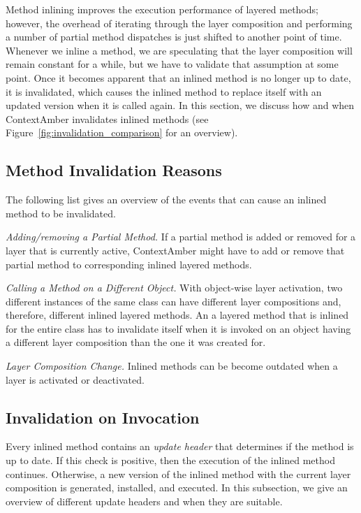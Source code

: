 \documentclass{sig-alternate}
\begin{document}
Method inlining improves the execution performance of layered methods; however, the overhead of iterating through the layer composition and performing a number of partial method dispatches is just shifted to another point of time. Whenever we inline a method, we are speculating that the layer composition will remain constant for a while, but we have to validate that assumption at some point. Once it becomes apparent that an inlined method is no longer up to date, it is invalidated, which causes the inlined method to replace itself with an updated version when it is called again. In this section, we discuss how and when ContextAmber invalidates inlined methods (see Figure~\ref{fig:invalidation_comparison} for an overview).

\subsection{Method Invalidation Reasons}
The following list gives an overview of the events that can cause an inlined method to be invalidated.

\begin{compact_item}
    \item \emph{Adding/removing a Partial Method.} If a partial method is added or removed for a layer that is currently active, ContextAmber might have to add or remove that partial method to corresponding inlined layered methods.
    \item \emph{Calling a Method on a Different Object.} With object-wise layer activation, two different instances of the same class can have different layer compositions and, therefore, different inlined layered methods. An a layered method that is inlined for the entire class has to invalidate itself when it is invoked on an object having a different layer composition than the one it was created for.
    \item \emph{Layer Composition Change.} Inlined methods can be become outdated when a layer is activated or deactivated.
\end{compact_item}

\subsection{Invalidation on Invocation}
Every inlined method contains an \emph{update header} that determines if the method is up to date. If this check is positive, then the execution of the inlined method continues. Otherwise, a new version of the inlined method with the current layer composition is generated, installed, and executed. In this subsection, we give an overview of different update headers and when they are suitable.
\end{document}
